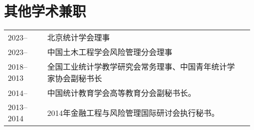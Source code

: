\documentclass[twoside,a4paper,11pt]{article}
\begin{document}
\section*{其他学术兼职}
\begin{tabular}{l p{} l}
  2023--     & 北京统计学会理事                 \\
  2023--     & 中国土木工程学会风险管理分会理事 \\
  2018--2013 & 全国工业统计学教学研究会常务理事、中国青年统计学家协会副秘书长 \\
  2014--     & 中国统计教育学会高等教育分会副秘书长。                         \\
  2013--2014 & 2014年金融工程与风险管理国际研讨会执行秘书。                   \\

\end{tabular}


\end{document}

